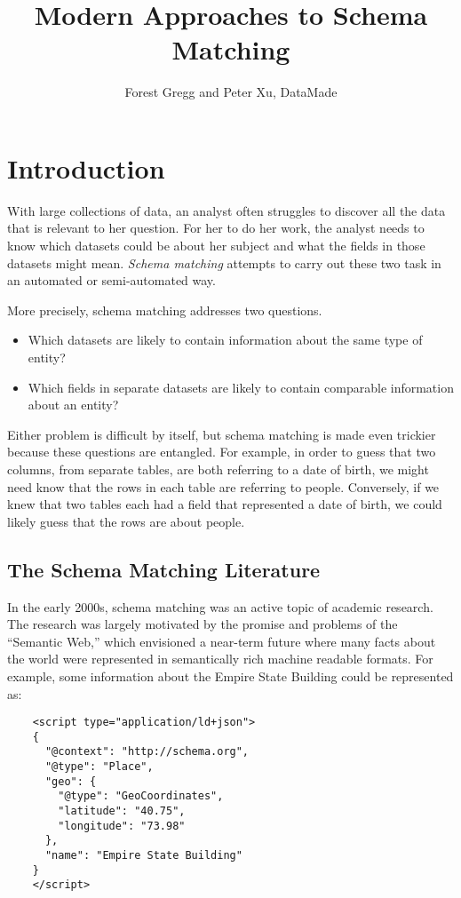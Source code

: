\documentclass{datamade}
\title{Modern Approaches to Schema Matching}
\author{Forest Gregg and Peter Xu, DataMade}
\theoremstyle{definition}
\theoremstyle{remark}
\begin{document}
	\maketitle
	
\section*{Introduction}

With large collections of data, an analyst often struggles to discover
all the data that is relevant to her question. For her to do her
work, the analyst needs to know which datasets could be about her
subject and what the fields in those datasets might mean. \emph{Schema
  matching} attempts to carry out these two task in an automated or
semi-automated way.

More precisely, schema matching addresses two questions.

\begin{itemize}
  \item Which datasets are likely to contain information about the
    same type of entity?
  \item Which fields in separate datasets are likely to contain comparable
    information about an entity?
\end{itemize}

Either problem is difficult by itself, but schema matching is made
even trickier because these questions are entangled. For example, in
order to guess that two columns, from separate tables, are both
referring to a date of birth, we might need know that the rows in each
table are referring to people. Conversely, if we knew that two tables
each had a field that represented a date of birth, we could likely
guess that the rows are about people.

\subsection*{The Schema Matching Literature}
In the early 2000s, schema matching was an active topic of academic
research. The research was largely motivated by the promise and
problems of the ``Semantic Web,'' which envisioned a near-term future
where many facts about the world were represented in semantically rich
machine readable formats. For example, some information about the
Empire State Building could be represented as:

\begin{verbatim}
    <script type="application/ld+json">
    {
      "@context": "http://schema.org",
      "@type": "Place",
      "geo": {
        "@type": "GeoCoordinates",
        "latitude": "40.75",
        "longitude": "73.98"
      },
      "name": "Empire State Building"
    }
    </script>
\end{verbatim}
\end{document}
